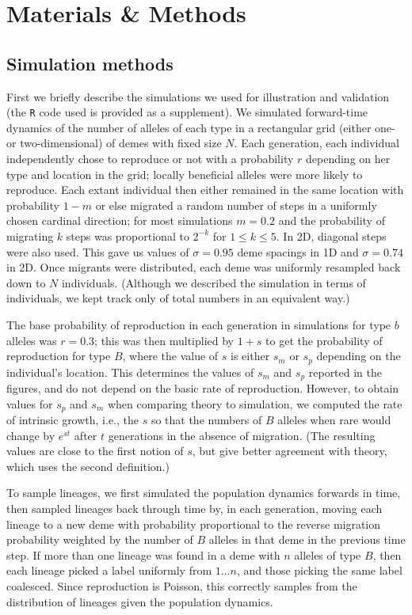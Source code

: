 \documentclass[10pt,letterpaper]{article}
\begin{document}
\section*{Materials \& Methods}

\subsection{Simulation methods}
\label{ss:simulations}

First we briefly describe the simulations we used for illustration and validation
(the \texttt{R} code used is provided as a supplement).
We simulated forward-time dynamics of the number of alleles of each type in a rectangular grid (either one- or two-dimensional) of demes with fixed size $N$.
Each generation, each individual independently chose to reproduce or not with a probability $r$ depending on her type and location in the grid;
locally beneficial alleles were more likely to reproduce.
Each extant individual then either remained in the same location with probability $1-m$
or else migrated a random number of steps 
in a uniformly chosen cardinal direction; 
for most simulations $m=0.2$ and
the probability of migrating $k$ steps was proportional to $2^{-k}$ for $1\le k \le 5$.
In 2D, diagonal steps were also used.
This gave us values of $\sigma=0.95$ deme spacings in 1D
and $\sigma=0.74$ in 2D.
Once migrants were distributed, each deme was uniformly resampled back down to $N$ individuals.
(Although we described the simulation in terms of individuals,
we kept track only of total numbers in an equivalent way.)

The base probability of reproduction in each generation in simulations for type $b$ alleles was $r=0.3$;
this was then multiplied by $1+s$ to get the probability of reproduction for type $B$,
where the value of $s$ is either $s_m$ or $s_p$ depending on the individual's location.
This determines the values of $s_m$ and $s_p$ reported in the figures, 
and do not depend on the basic rate of reproduction. 
However, to obtain values for $s_p$ and $s_m$ when comparing theory to simulation,
we computed the rate of intrinsic growth, 
i.e., the $s$ so that the numbers of $B$ alleles when rare would change by $e^{st}$ after $t$ generations
in the absence of migration.
(The resulting values are close to the first notion of $s$,
but give better agreement with theory,
which uses the second definition.)

To sample lineages, we first simulated the population dynamics forwards in time,
then sampled lineages back through time
by, in each generation,
moving each lineage to a new deme with probability proportional to the reverse migration probability
weighted by the number of $B$ alleles in that deme in the previous time step.
If more than one lineage was found in a deme with $n$ alleles of type $B$,
then each lineage picked a label uniformly from $1 \ldots n$,
and those picking the same label coalesced.
Since reproduction is Poisson, this correctly samples from the distribution of lineages given the population dynamics.
\end{document}

